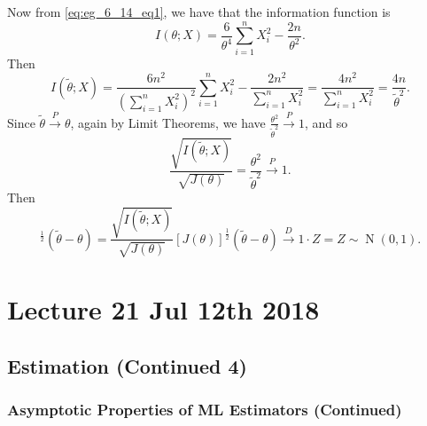 \documentclass[notoc,notitlepage]{tufte-book}
\DeclareMathOperator{\Nor}{N }
\newcommand{\convd}{\overset{D}{\to}}
\newcommand{\convp}{\overset{P}{\to}}
\begin{document}
\begin{solution}
  Now from \cref{eq:eg_6_14_eq1}, we have that the information function is
  \begin{equation*}
    I(\theta; X) = \frac{6}{\theta^4} \sum_{i=1}^{n} X_i^2 - \frac{2n}{\theta^2}.
  \end{equation*}
  Then
  \begin{equation*}
    I(\tilde{\theta}; X) = \frac{6n^2}{\left( \sum\limits_{i=1}^{n} X_i^2 \right)^2} \sum_{i=1}^{n} X_i^2 - \frac{2n^2}{ \sum\limits_{i=1}^{n} X_i^2 } = \frac{4n^2}{\sum_{i=1}^{n} X_i^2} = \frac{4n}{\tilde{\theta}^2}.
  \end{equation*}
  Since $\tilde{\theta} \convp \theta$, again by Limit Theorems, we have $\frac{\theta^2}{\tilde{\theta}^2} \convp 1$, and so
  \begin{equation*}
    \frac{\sqrt{I(\tilde{\theta}; X)}}{\sqrt{J(\theta)}} = \frac{\theta^2}{\tilde{\theta}^2} \convp 1.
  \end{equation*}
  Then
  \begin{equation*}
    [I(\tilde{\theta}; X)]^{\frac{1}{2}} ( \tilde{\theta} - \theta ) = \frac{\sqrt{I(\tilde{\theta}; X)}}{\sqrt{J(\theta)}} [ J(\theta) ]^{\frac{1}{2}} (\tilde{\theta} - \theta) \convd 1 \cdot Z = Z \sim \Nor(0, 1).
  \end{equation*}
\end{solution}




\chapter{Lecture 21 Jul 12th 2018}%
\label{chp:lecture_21_jul_12th_2018}

\section{Estimation (Continued 4)}%
\label{sec:estimation_continued_4}

\subsection{Asymptotic Properties of ML Estimators (Continued)}%
\label{sub:asymptotic_properties_of_ml_estimators_continued}
\end{document}
